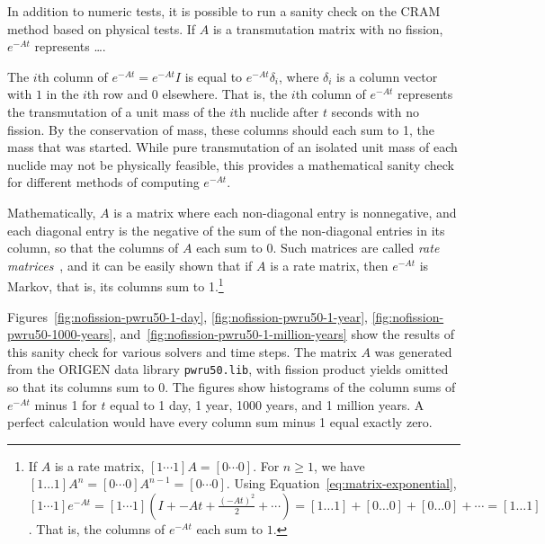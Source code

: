 In addition to numeric tests, it is possible to run a sanity check on the CRAM
method based on physical tests. If $A$ is a transmutation matrix with no
fission, $e^{-At}$ represents {\color{red}\ldots}.

The $i$th column of $e^{-At}=e^{-At}I$ is equal to $e^{-At}\delta_{i}$, where
$\delta_i$ is a column vector with $1$ in the $i$th row and $0$ elsewhere.
That is, the $i$th column of $e^{-At}$ represents the transmutation of a unit
mass of the $i$th nuclide after $t$ seconds with no fission. By the
conservation of mass, these columns should each sum to 1, the mass that was
started. While pure transmutation of an isolated unit mass of each nuclide may
not be physically feasible, this provides a mathematical sanity check for
different methods of computing $e^{-At}$.

Mathematically, $A$ is a matrix where each non-diagonal entry is nonnegative,
and each diagonal entry is the negative of the sum of the non-diagonal entries
in its column, so that the columns of $A$ each sum to $0$. Such matrices are
called \textit{rate matrices}~\cite{glasser1980properties}, and it can be
easily shown that if $A$ is a rate matrix, then $e^{-At}$ is Markov, that is,
its columns sum to 1.\footnote{If $A$ is a rate matrix,
$[1 \cdots 1] A = [0 \cdots 0]$. For $n\geq 1$, we have $[1 \ldots 1] A^n = [0 \cdots 0] A^{n-1} = [0\cdots 0]$. Using
Equation~\ref{eq:matrix-exponential},
$[1 \cdots 1]e^{-At} = [1 \cdots 1] (I + -At + \frac{(-At)^2}{2} + \cdots) =
[1\ldots 1] + [0 \ldots 0] + [0 \ldots 0] + \cdots = [1\ldots 1]$. That is,
the columns of $e^{-At}$ each sum to $1$.}

Figures~\ref{fig:nofission-pwru50-1-day}, \ref{fig:nofission-pwru50-1-year},
\ref{fig:nofission-pwru50-1000-years},
and~\ref{fig:nofission-pwru50-1-million-years} show the results of this sanity
check for various solvers and time steps. The matrix $A$ was generated from
the ORIGEN data library \texttt{pwru50.lib}, with fission product yields
omitted so that its columns sum to $0$. The figures show histograms of the
column sums of $e^{-At}$ minus 1 for $t$ equal to 1 day, 1 year, 1000 years,
and 1 million years. A perfect calculation would have every column sum minus 1
equal exactly zero.

